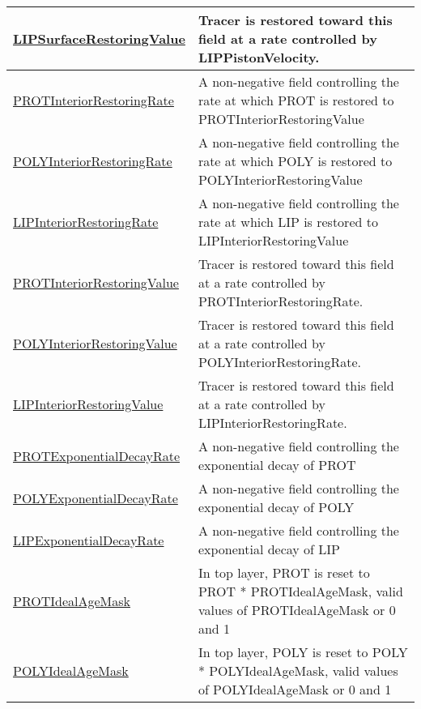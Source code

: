 {\begin{center}
\begin{longtable}{| p{2.0in} | p{4.0in} |}
    \hline
    \hyperref[subsec:var_sec_forcing_LIPSurfaceRestoringValue]{LIPSurfaceRestoringValue} & Tracer is restored toward this field at a rate controlled by LIPPistonVelocity. \\
    \hline
    \hyperref[subsec:var_sec_forcing_PROTInteriorRestoringRate]{PROTInteriorRestoringRate} & A non-negative field controlling the rate at which PROT is restored to PROTInteriorRestoringValue \\
    \hline
    \hyperref[subsec:var_sec_forcing_POLYInteriorRestoringRate]{POLYInteriorRestoringRate} & A non-negative field controlling the rate at which POLY is restored to POLYInteriorRestoringValue \\
    \hline
    \hyperref[subsec:var_sec_forcing_LIPInteriorRestoringRate]{LIPInteriorRestoringRate} & A non-negative field controlling the rate at which LIP is restored to LIPInteriorRestoringValue \\
    \hline
    \hyperref[subsec:var_sec_forcing_PROTInteriorRestoringValue]{PROTInteriorRestoringValue} & Tracer is restored toward this field at a rate controlled by PROTInteriorRestoringRate. \\
    \hline
    \hyperref[subsec:var_sec_forcing_POLYInteriorRestoringValue]{POLYInteriorRestoringValue} & Tracer is restored toward this field at a rate controlled by POLYInteriorRestoringRate. \\
    \hline
    \hyperref[subsec:var_sec_forcing_LIPInteriorRestoringValue]{LIPInteriorRestoringValue} & Tracer is restored toward this field at a rate controlled by LIPInteriorRestoringRate. \\
    \hline
    \hyperref[subsec:var_sec_forcing_PROTExponentialDecayRate]{PROTExponentialDecayRate} & A non-negative field controlling the exponential decay of PROT \\
    \hline
    \hyperref[subsec:var_sec_forcing_POLYExponentialDecayRate]{POLYExponentialDecayRate} & A non-negative field controlling the exponential decay of POLY \\
    \hline
    \hyperref[subsec:var_sec_forcing_LIPExponentialDecayRate]{LIPExponentialDecayRate} & A non-negative field controlling the exponential decay of LIP \\
    \hline
    \hyperref[subsec:var_sec_forcing_PROTIdealAgeMask]{PROTIdealAgeMask} & In top layer, PROT is reset to PROT * PROTIdealAgeMask, valid values of PROTIdealAgeMask or 0 and 1 \\
    \hline
    \hyperref[subsec:var_sec_forcing_POLYIdealAgeMask]{POLYIdealAgeMask} & In top layer, POLY is reset to POLY * POLYIdealAgeMask, valid values of POLYIdealAgeMask or 0 and 1 \\

\end{longtable}
\end{center}}
